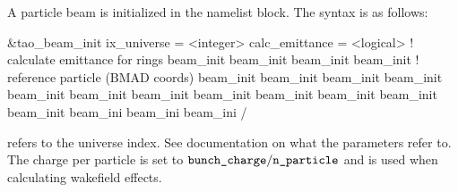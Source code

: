 A particle beam is initialized in the  namelist block.
The syntax is as follows:
\begin{example}
  &tao_beam_init
    ix_universe             = <integer>
    calc_emittance          = <logical>   ! calculate emittance for rings
    beam_init%
    beam_init%
    beam_init%
    beam_init%
                                          ! reference particle (BMAD coords)
    beam_init%
    beam_init%
    beam_init%
    beam_init%
    beam_init%
    beam_init%
    beam_init%
    beam_init%
    beam_init%
    beam_init%
    beam_init%
    beam_init%
    beam_ini%
    beam_ini%
    beam_ini%
  /
\end{example}
 refers to the universe index. See \bmad documentation on what
the  parameters refer to.  The charge per particle is set to
$\vn{bunch_charge} / \vn{n_particle}$ and is used when calculating wakefield
effects.


